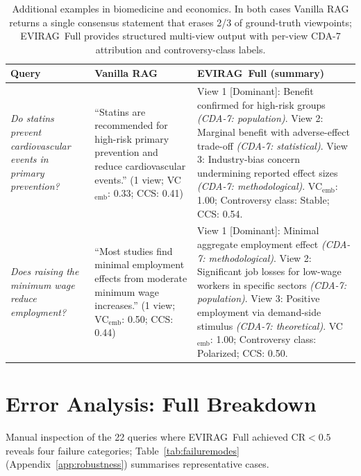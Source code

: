 \documentclass[11pt]{article}
\newcommand{\system}{\textsc{EVIRAG}\xspace}
\begin{document}
\begin{table}[t]
\centering\small
\setlength{\tabcolsep}{5pt}
\begin{tabular}{@{}p{}p{}p{}@{}}
\toprule
\textbf{Query} & \textbf{Vanilla RAG} & \textbf{\system\ Full (summary)} \\
\midrule
\textit{Do statins prevent cardiovascular events in primary prevention?}
&
``Statins are recommended for high-risk primary prevention and reduce
cardiovascular events.'' (1 view; VC$_\text{emb}$: 0.33; CCS: 0.41)
&
View 1 [Dominant]: Benefit confirmed for high-risk groups
\textit{(CDA-7: population)}.
View 2: Marginal benefit with adverse-effect trade-off
\textit{(CDA-7: statistical)}.
View 3: Industry-bias concern undermining reported effect sizes
\textit{(CDA-7: methodological)}.
VC$_\text{emb}$: 1.00; Controversy class: Stable; CCS: 0.54.
\\[4pt]
\textit{Does raising the minimum wage reduce employment?}
&
``Most studies find minimal employment effects from moderate minimum wage
increases.'' (1 view; VC$_\text{emb}$: 0.50; CCS: 0.44)
&
View 1 [Dominant]: Minimal aggregate employment effect
\textit{(CDA-7: methodological)}.
View 2: Significant job losses for low-wage workers in specific sectors
\textit{(CDA-7: population)}.
View 3: Positive employment via demand-side stimulus
\textit{(CDA-7: theoretical)}.
VC$_\text{emb}$: 1.00; Controversy class: Polarized; CCS: 0.50.
\\
\bottomrule
\end{tabular}
\caption{Additional examples in biomedicine and economics.  In both cases
Vanilla RAG returns a single consensus statement that erases 2/3 of
ground-truth viewpoints; \system\ Full provides structured multi-view output
with per-view CDA-7 attribution and controversy-class labels.}
\label{tab:qualitative2}
\end{table}

\section{Error Analysis: Full Breakdown}
\label{app:error}

Manual inspection of the 22 queries where \system\ Full achieved
CR${<}0.5$ reveals four failure categories; Table~\ref{tab:failuremodes}
(Appendix~\ref{app:robustness}) summarises representative cases.
\end{document}

